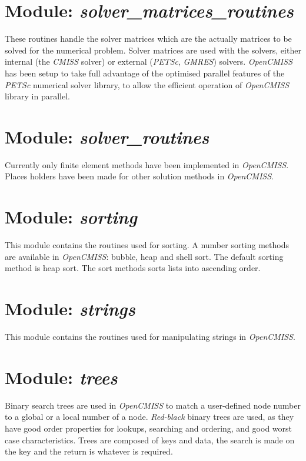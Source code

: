 \section{Module: \emph{solver\_matrices\_routines}}
\label{sec:solvermatricesroutines}

These routines handle the solver matrices which are the actually matrices to 
be solved for the numerical problem. Solver matrices are used with the solvers, 
either internal (the \emph{CMISS} solver) or external (\emph{PETSc}, 
\emph{GMRES}) solvers. \emph{OpenCMISS} has been setup to take full advantage of 
the optimised parallel features of the \emph{PETSc} numerical solver library, to  
allow the efficient operation of \emph{OpenCMISS} library in parallel.


\section{Module: \emph{solver\_routines}}
\label{sec:solverroutines}

Currently only finite element methods have been implemented in \emph{OpenCMISS}. 
Places holders have been made for other solution methods in \emph{OpenCMISS}.


\section{Module: \emph{sorting}}
\label{sec:sorting}

This module contains the routines used for sorting. A number sorting methods 
are available in \emph{OpenCMISS}: bubble, heap and shell sort. The default 
sorting method is heap sort. The sort methods sorts lists into ascending order. 


\section{Module: \emph{strings}}
\label{sec:strings}

This module contains the routines used for manipulating strings in 
\emph{OpenCMISS}.


\section{Module: \emph{trees}}
\label{sec:trees}

Binary search trees are used in \emph{OpenCMISS} to match a user-defined node 
number to a global or a local number of a node. \emph{Red-black} binary trees 
are used, as they have good order properties for lookups, searching and 
ordering, and good worst case characteristics. Trees are composed of keys and 
data, the search is made on the key and the return is whatever is required.

